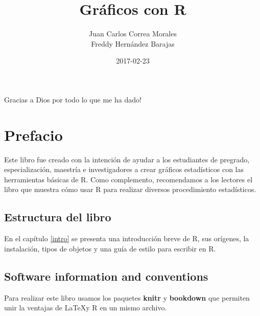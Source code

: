 \documentclass[10pt,]{krantz}
\title{Gráficos con R}
\author{Juan Carlos Correa Morales\\
Freddy Hernández Barajas}
\date{2017-02-23}
\let\proglang=\textsf
\begin{document}
\maketitle


\thispagestyle{empty}

\begin{center}


Gracias a Dios por todo lo que me ha dado!

\end{center}

\setlength{\abovedisplayskip}{-5pt}
\setlength{\abovedisplayshortskip}{-5pt}

{
\hypersetup{linkcolor=black}
\setcounter{tocdepth}{2}
\tableofcontents
}
\listoftables
\listoffigures
\chapter*{Prefacio}\label{prefacio}


Este libro fue creado con la intención de ayudar a los estudiantes de
pregrado, especialización, maestría e investigadores a crear gráficos
estadísticos con las herramientas básicas de \proglang{R}. Como
complemento, recomendamos a los lectores el libro
\citet{hernandez_usuga} que muestra cómo usar \proglang{R} para realizar
diversos procedimiento estadísticos.

\section*{Estructura del libro}\label{estructura-del-libro}


En el capítulo \ref{intro} se presenta una introducción breve de
\proglang{R}, sus orígenes, la instalación, tipos de objetos y una guía
de estilo para escribir en \proglang{R}.

\section*{Software information and
conventions}\label{software-information-and-conventions}


Para realizar este libro usamos los paquetes \textbf{knitr}
\citep{xie2015} y \textbf{bookdown} \citep{R-bookdown}
que permiten unir la ventajas de \LaTeX y \proglang{R} en un mismo
archivo.
\end{document}
